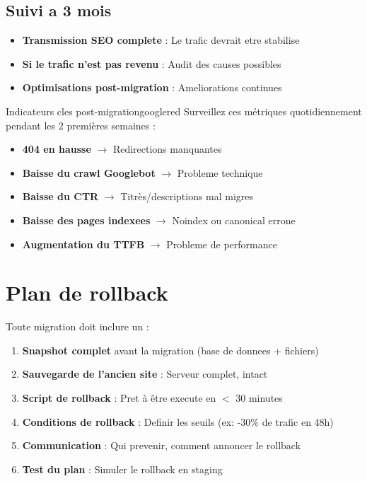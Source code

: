 \subsection{Suivi a 3 mois}

\begin{itemize}
    \item \textbf{Transmission SEO complete} : Le trafic devrait etre stabilise
    \item \textbf{Si le trafic n'est pas revenu} : Audit des causes possibles
    \item \textbf{Optimisations post-migration} : Ameliorations continues
\end{itemize}

\begin{mybox}{Indicateurs cles post-migration}{googlered}
Surveillez ces métriques quotidiennement pendant les 2 premières semaines :
\begin{itemize}
    \item \textbf{404 en hausse} $\rightarrow$ Redirections manquantes
    \item \textbf{Baisse du crawl Googlebot} $\rightarrow$ Probleme technique
    \item \textbf{Baisse du CTR} $\rightarrow$ Titrès/descriptions mal migres
    \item \textbf{Baisse des pages indexees} $\rightarrow$ Noindex ou canonical errone
    \item \textbf{Augmentation du TTFB} $\rightarrow$ Probleme de performance
\end{itemize}
\end{mybox}

\section{Plan de rollback}

Toute migration doit inclure un  :

\begin{enumerate}
    \item \textbf{Snapshot complet} avant la migration (base de donnees + fichiers)
    \item \textbf{Sauvegarde de l'ancien site} : Serveur complet, intact
    \item \textbf{Script de rollback} : Pret à être execute en $<$ 30 minutes
    \item \textbf{Conditions de rollback} : Definir les seuils (ex: -30\% de trafic en 48h)
    \item \textbf{Communication} : Qui prevenir, comment annoncer le rollback
    \item \textbf{Test du plan} : Simuler le rollback en staging
\end{enumerate}

